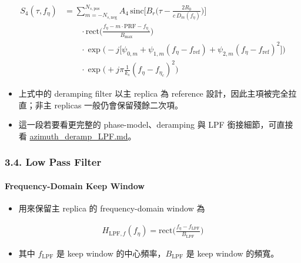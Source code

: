 \documentclass[10pt]{article}
\providecommand{\tightlist}{%
  \setlength{\itemsep}{0pt}\setlength{\parskip}{0pt}}
\begin{document}
\begin{equation}
\begin{aligned}
S_4(\tau,f_\eta)
&=
\sum_{m=-N_{s,\mathrm{neg}}}^{N_{s,\mathrm{pos}}} A_4\,
\mathrm{sinc}\biggl[ B_r\biggl( \tau-\frac{2R_0}{c\,D_m(f_\eta)} \biggr) \biggr]\\
&\qquad \cdot \mathrm{rect}\biggl( \frac{f_\eta-m\cdot\mathrm{PRF}-f_{\eta_c}}{B_{\max}} \biggr)\\
&\qquad \cdot \exp\biggl( -j\biggl[ \psi_{0,m}+\psi_{1,m}(f_\eta-f_{\mathrm{ref}})
+\psi_{2,m}(f_\eta-f_{\mathrm{ref}})^2 \biggr] \biggr)\\
&\qquad \cdot \exp\biggl( +j\pi\frac{1}{k_s}(f_\eta-f_{\eta_c})^2 \biggr)
\end{aligned}
\end{equation}

\begin{itemize}
\item
  上式中的 deramping filter 以主 replica 為 reference
  設計，因此主項被完全拉直；非主 replicas 一般仍會保留殘餘二次項。
\item
  這一段若要看更完整的 phase-model、deramping 與 LPF 銜接細節，可直接看
  \href{./azimuth_deramp_LPF.md}{azimuth\_deramp\_LPF.md}。
\end{itemize}

\hypertarget{low-pass-filter}{%
\subsubsection{3.4. Low Pass Filter}\label{low-pass-filter}}

\hypertarget{frequency-domain-keep-window}{%
\paragraph{Frequency-Domain Keep
Window}\label{frequency-domain-keep-window}}

\begin{itemize}
\tightlist
\item
  用來保留主 replica 的 frequency-domain window 為
\end{itemize}

\begin{equation}
\begin{aligned}
H_{\mathrm{LPF},f}(f_\eta)=\mathrm{rect}\biggl(\frac{f_\eta-f_{\mathrm{LPF}}}{B_{\mathrm{LPF}}}\biggr)
\end{aligned}
\end{equation}

\begin{itemize}
\tightlist
\item
  其中 \(f_{\mathrm{LPF}}\) 是 keep window
  的中心頻率，\(B_{\mathrm{LPF}}\) 是 keep window 的頻寬。
\end{itemize}
\end{document}
